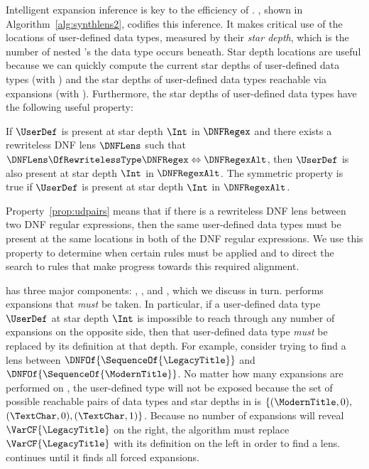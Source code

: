 \documentclass[acmsmall,screen]{acmart}
\begin{document}
Intelligent expansion inference is key to the efficiency of \Optician{}.
\Expand{}, shown in Algorithm~\ref{alg:synthlens2}, codifies this inference.
It makes critical use of the locations of user-defined data types, measured 
by their \emph{star depth}, which is the number of nested \Star{}'s the data type occurs beneath.
Star depth locations are useful because we can quickly compute the
current star depths of user-defined data types (with \GetCurrentSet{}) and the
star depths of user-defined data types reachable via expansions
(with \GetTransitiveSet{}).
Furthermore, the star depths of user-defined data types have the following useful property:

\begin{property}
\label{prop:udpairs}
  If $\UserDef$ is present at star depth $\Int$ in $\DNFRegex$ and there
  exists a rewriteless
  DNF lens $\DNFLens$ such that $\DNFLens \OfRewritelessType \DNFRegex
  \Leftrightarrow \DNFRegexAlt$, then $\UserDef$ is also present at star depth
  $\Int$ in $\DNFRegexAlt$.  The symmetric property is true if $\UserDef$ is
  present at star depth $\Int$ in $\DNFRegexAlt$.
\end{property}

Property~\ref{prop:udpairs} means that if there is a rewriteless DNF lens
between two DNF regular expressions, then the same user-defined
data types must be present at the same locations in both of the DNF regular
expressions. We use this
property to determine when certain rules must be applied and to direct the search
to rules that make progress towards this required alignment.

\Expand{} has three major components: \ExpandRequired{}, \FixProblemElts{}, and
\ExpandOnce{}, which we discuss in turn.
\ExpandRequired{} performs expansions that \emph{must} be taken.  In particular,
if a user-defined data type $\UserDef$ at star depth $\Int$ is impossible 
to reach through any number of expansions on the opposite side, then that 
user-defined data type \emph{must} be replaced by its definition at
that depth.
For example, 
consider trying to find a lens between $\DNFOf{\SequenceOf{\LegacyTitle}}$ and
$\DNFOf{\SequenceOf{\ModernTitle}}$.
No matter how many expansions are performed on
, the user-defined type 
will not be exposed 
because the set of possible reachable pairs of
data types and star depths in  is $\{(\ModernTitle,0),
$ $(\TextChar,0),(\TextChar,1)\}$.  Because no number of expansions will reveal
$\VarCF{\LegacyTitle}$ on the right, 
the algorithm must replace $\VarCF{\LegacyTitle}$ with its definition
on the left in order to find a lens.
\ExpandRequired{} continues until it finds all forced expansions.
\end{document}
